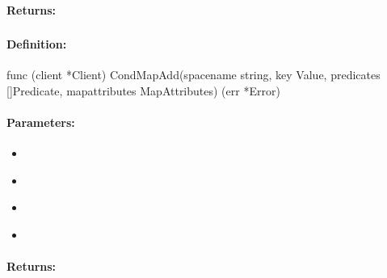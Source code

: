 \paragraph{Returns:}


\pagebreak
\subsubsection{}
\label{api:Go:CondMapAdd}


\paragraph{Definition:}
\begin{gocode}
func (client *Client) CondMapAdd(spacename string, key Value, predicates []Predicate, mapattributes MapAttributes) (err *Error)
\end{gocode}

\paragraph{Parameters:}
\begin{itemize}[noitemsep]
\item {}\\

\item {}\\

\item {}\\

\item {}\\

\end{itemize}

\paragraph{Returns:}


\pagebreak
\subsubsection{}
\label{api:Go:GroupMapAdd}


